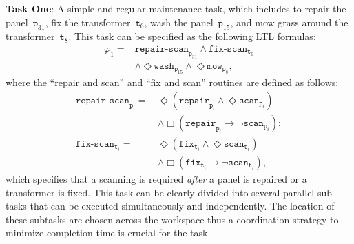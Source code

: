 \textbf{Task One}: A simple and regular maintenance task,
which includes to repair the panel~$\texttt{p}_{31}$,
fix the transformer~$\texttt{t}_6$, wash the panel~$\texttt{p}_{15}$,
and mow grass around the transformer~$\texttt{t}_8$.
This task can be specified as the following LTL formulas:
\begin{equation}\label{eq:task1}
  \begin{aligned}
\varphi_1 = & \texttt{repair-scan}_{\texttt{p}_{31}}
\wedge \texttt{fix-scan}_{\texttt{t}_{6}}\\
&\wedge \Diamond \texttt{wash}_{\texttt{p}_{15}}
\wedge \Diamond \texttt{mow}_{\texttt{p}_8},
\end{aligned}
\end{equation}
where the ``repair and scan'' and ``fix and scan'' routines are defined as follows:
\begin{equation*}
\begin{aligned}
  \texttt{repair-scan}_{\texttt{p}_i}=\,
  & \Diamond \left({\texttt{repair}_{\texttt{p}_i}}
  \wedge \Diamond {\texttt{scan}_{\texttt{p}_i}}\right)\\
&\wedge \Box \left(\texttt{repair}_{\texttt{p}_i}
\rightarrow \lnot \texttt{scan}_{\texttt{p}_i}\right);\\
\texttt{fix-scan}_{\texttt{t}_i} =\,
& \Diamond \left({\texttt{fix}_{\texttt{t}_i}}
\wedge \Diamond {\texttt{scan}_{\texttt{t}_i}}\right)\\
&\wedge \Box \left(\texttt{fix}_{\texttt{t}_i}
\rightarrow \lnot \texttt{scan}_{\texttt{t}_i}\right),
\end{aligned}
\end{equation*}
which specifies that a scanning is required \emph{after}
a panel is repaired or a transformer is fixed.
This task can be clearly divided into several parallel sub-tasks
that can be executed simultaneously and independently.
The location of these subtasks are chosen across the workspace
thus a coordination strategy to minimize completion time is crucial for the task.

